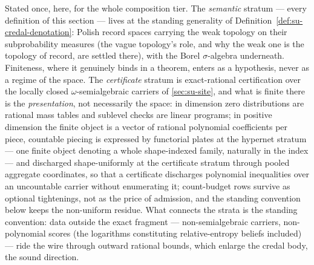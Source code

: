 \begin{remark}
\label{rem:su-strata}
Stated once, here, for the whole composition tier. The
\emph{semantic} stratum --- every definition of this section ---
lives at the standing generality of
Definition~\ref{def:su-credal-denotation}: Polish record spaces
carrying the weak topology on their subprobability measures (the
vague topology's role, and why the weak one is the topology of
record, are settled there), with the Borel $\sigma$-algebra
underneath. Finiteness, where it genuinely
binds in a theorem, enters as a hypothesis, never as a regime of
the space. The \emph{certificate} stratum is exact-rational
certification over the locally closed $\omega$-semialgebraic
carriers of \autoref{sec:su-site}, and what is finite there is
the \emph{presentation}, not necessarily the space: in dimension
zero distributions are rational mass tables and sublevel checks are
linear programs; in positive dimension the finite object is a
vector of rational polynomial coefficients per piece, countable
piecing is expressed by functorial plates at the hypernet stratum
--- one finite object denoting a whole shape-indexed family,
naturally in the index --- and discharged shape-uniformly at the
certificate stratum through pooled aggregate coordinates, so that a
certificate
discharges
polynomial inequalities over an uncountable carrier without
enumerating it; count-budget rows survive as optional tightenings,
not as the price of admission, and the standing convention below
keeps the non-uniform residue. What connects the strata is the standing
convention: data outside the exact fragment --- non-semialgebraic
carriers, non-polynomial scores (the logarithms constituting
relative-entropy beliefs included) --- ride the wire through outward rational
bounds, which enlarge the credal body, the sound direction.
\end{remark}

